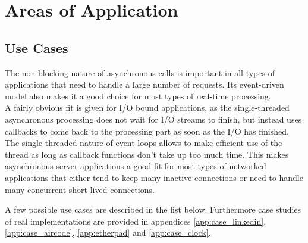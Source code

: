 \newpage
\section{Areas of Application}
\label{areas_of_application}

\subsection{Use Cases}
\label{use_cases}
The non-blocking nature of asynchronous calls is important in all types of
applications that need to handle a large number of requests. Its event-driven model
also makes it a good choice for most types of real-time processing.\\
A fairly obvious fit is given for I/O bound applications, as the single-threaded asynchronous processing
does not wait for I/O streams to finish, but instead uses callbacks to come back to the processing part
as soon as the I/O has finished.
The single-threaded nature of event loops allows to make efficient use of the
thread as long as callback functions don't take up too much time. This makes asynchronous
server applications a good fit for most types of networked applications that
either tend to keep many inactive connections or need to handle many concurrent 
short-lived connections.

A few possible use cases are described in the list below. Furthermore case studies of real
implementations are provided in appendices \ref{app:case_linkedin}, \ref{app:case_aircode},
\ref{app:etherpad} and \ref{app:case_clock}.


